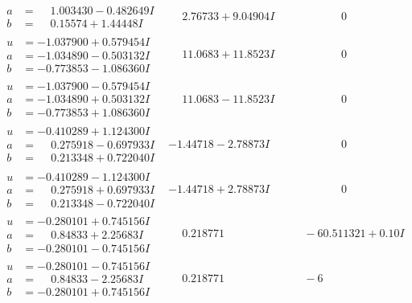 \documentclass[1p]{elsarticle_modified}
\theoremstyle{definition}
\begin{document}
$$\begin{array}{c|c|c}
\begin{aligned}
a &= \phantom{-}1.003430 - 0.482649 I \\
b &= \phantom{-}0.15574 + 1.44448 I\end{aligned}
 & \phantom{-}2.76733 + 9.04904 I & \phantom{-0.000000 } 0 \\ \hline\begin{aligned}
u &= -1.037900 + 0.579454 I \\
a &= -1.034890 - 0.503132 I \\
b &= -0.773853 - 1.086360 I\end{aligned}
 & \phantom{-}11.0683 + 11.8523 I & \phantom{-0.000000 } 0 \\ \hline\begin{aligned}
u &= -1.037900 - 0.579454 I \\
a &= -1.034890 + 0.503132 I \\
b &= -0.773853 + 1.086360 I\end{aligned}
 & \phantom{-}11.0683 - 11.8523 I & \phantom{-0.000000 } 0 \\ \hline\begin{aligned}
u &= -0.410289 + 1.124300 I \\
a &= \phantom{-}0.275918 - 0.697933 I \\
b &= \phantom{-}0.213348 + 0.722040 I\end{aligned}
 & -1.44718 - 2.78873 I & \phantom{-0.000000 } 0 \\ \hline\begin{aligned}
u &= -0.410289 - 1.124300 I \\
a &= \phantom{-}0.275918 + 0.697933 I \\
b &= \phantom{-}0.213348 - 0.722040 I\end{aligned}
 & -1.44718 + 2.78873 I & \phantom{-0.000000 } 0 \\ \hline\begin{aligned}
u &= -0.280101 + 0.745156 I \\
a &= \phantom{-}0.84833 + 2.25683 I \\
b &= -0.280101 - 0.745156 I\end{aligned}
 & \phantom{-}0.218771\phantom{ +0.000000I} & \phantom{-}                -6
0.511321 + 0. 10   I\phantom{ +0.000000I} \\ \hline\begin{aligned}
u &= -0.280101 - 0.745156 I \\
a &= \phantom{-}0.84833 - 2.25683 I \\
b &= -0.280101 + 0.745156 I\end{aligned}
 & \phantom{-}0.218771\phantom{ +0.000000I} & \phantom{-}                -6

\end{array}$$
\end{document}
